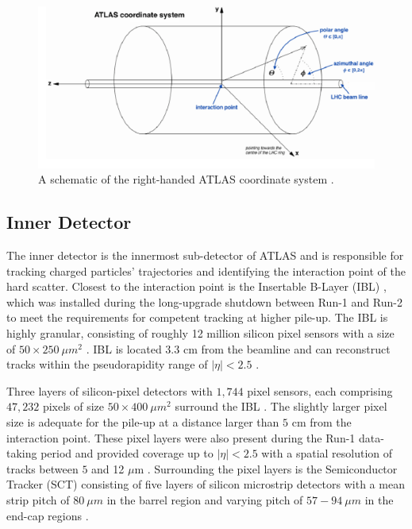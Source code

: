 \begin{figure}
    \centering
    \includegraphics[width=.98\linewidth]{figures/LHC/ATLAS_CoordinateSys.png}
    \caption{ A schematic of the right-handed ATLAS coordinate system \cite{ATLAS_CoordSys}.\label{fig:ATLAS_CS}}
\end{figure}

\subsection{Inner Detector}
\label{subsec:ID}
The inner detector is the innermost sub-detector of ATLAS and is responsible for tracking charged particles' trajectories and identifying the interaction point of the hard scatter. Closest to the interaction point is the Insertable B-Layer (IBL) \cite{ATLAS_IBL}, which was installed during the long-upgrade shutdown between Run-1 and Run-2 to meet the requirements for competent tracking at higher pile-up. The IBL is highly granular, consisting of roughly 12 million silicon pixel sensors with a size of $50\times 250 ~\mu m^2$ \cite{ATLAS_IBL}. IBL is located $3.3$ cm from the beamline and can reconstruct tracks within the pseudorapidity range of $|\eta|<2.5$ \cite{ATLAS_IBL}. 

Three layers of silicon-pixel detectors with $1,744$ pixel sensors, each comprising $47,232$ pixels of size $50\times 400 ~\mu m^2$ surround the IBL \cite{ID_Pixel}. The slightly larger pixel size is adequate for the pile-up at a distance larger than $5$ cm from the interaction point. These pixel layers were also present during the Run-1 data-taking period and provided coverage up to $|\eta|<2.5$ with a spatial resolution of tracks between $5$ and 12 $\mu$m \cite{ID_Pixel}. Surrounding the pixel layers is the Semiconductor Tracker (SCT) consisting of five layers of silicon microstrip detectors with a mean strip pitch of $80 ~\mu m$ in the barrel region and varying pitch of  $57-94 ~\mu m$ in the end-cap regions \cite{ID_Strips}. 

